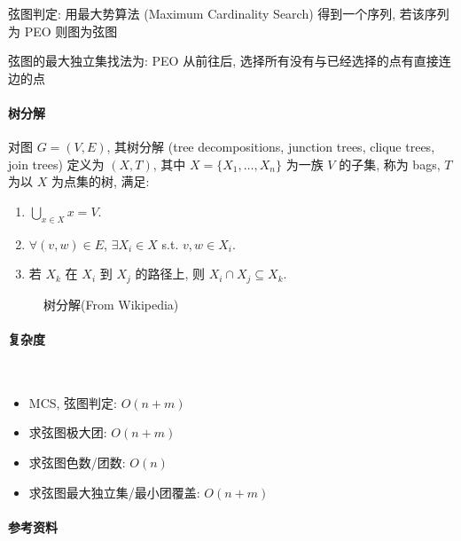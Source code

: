 弦图判定: 用最大势算法 (Maximum Cardinality Search) 得到一个序列, 若该序列为 PEO 则图为弦图

弦图的最大独立集找法为: PEO 从前往后, 选择所有没有与已经选择的点有直接连边的点

\paragraph{树分解}

对图 \(G=(V,E)\), 其树分解 (tree decompositions, junction trees, clique trees, join trees) 定义为 \((X,T)\), 其中 \(X=\{X_1,\dots,X_n\}\) 为一族 \(V\) 的子集, 称为 bags, \(T\) 为以 \(X\) 为点集的树, 满足:

\begin{enumerate}
    \item \(\bigcup_{x\in X} x=V\).
    \item \(\forall (v, w)\in E\), \(\exists X_i\in X\) s.t. \(v,w\in X_i\).
    \item 若 \(X_k\) 在 \(X_i\) 到 \(X_j\) 的路径上, 则 \(X_{i}\cap X_{j}\subseteq X_{k}\).
\end{enumerate}

\begin{figure}[h]
    \label{img:tree-decomposition}
    \centering
    
    \caption{树分解(From Wikipedia)}
\end{figure}

\paragraph{复杂度}~\\

\begin{itemize}
    \item MCS, 弦图判定: \(O(n+m)\)
    \item 求弦图极大团: \(O(n+m)\)
    \item 求弦图色数/团数: \(O(n)\)
    \item 求弦图最大独立集/最小团覆盖: \(O(n+m)\)
\end{itemize}

\paragraph{参考资料} \cite{enwiki:1204698483} \cite{enwiki:1217459734}


